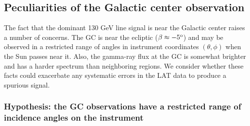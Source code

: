 \documentclass[aps,twocolumn,prd,superscriptaddress,showpacs,nofootinbib,fixfloat]{revtex4}
\newcommand{\degree}{^{\rm o}}
\begin{document}
\subsection{Peculiarities of the Galactic center observation}
The fact that the dominant 130 GeV line signal is near the Galactic center
raises a number of concerns.  The GC is near the ecliptic ($\beta \approx
-5\degree$) and may be observed in a restricted range of angles in instrument
coordinates $(\theta, \phi)$ when the Sun passes near it.  Also, the gamma-ray
flux at the GC is somewhat brighter and has a harder spectrum than neighboring
regions.  We consider whether these facts could exacerbate any systematic
errors in the LAT data to produce a spurious signal.

\subsubsection{Hypothesis: the GC observations have a restricted range of
incidence angles on the instrument}
\end{document}
